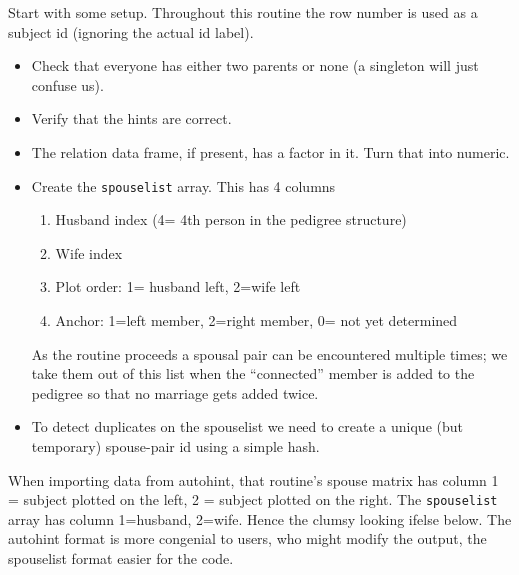 \documentclass{article}
\begin{document}
Start with some setup.  
Throughout this routine the row number is used as a subject
id (ignoring the actual id label).
\begin{itemize}
  \item Check that everyone has either two
    parents or none (a singleton will just confuse us).
  \item Verify that the hints are correct.
  \item The relation data frame, if present, has a factor in it.  Turn
    that into numeric.
\item Create the \Verb!spouselist! array.  This has 4 columns
  \begin{enumerate}
    \item Husband index (4= 4th person in the pedigree structure)
    \item Wife index
    \item Plot order: 1= husband left, 2=wife left
    \item Anchor: 1=left member, 2=right member, 0= not yet determined
      \end{enumerate}
  As the routine proceeds a spousal pair can be encountered
  multiple times; we take them out of this list when the ``connected''
  member is added to the pedigree so that no marriage gets added
  twice.  
\item To detect duplicates on the spouselist we need to create a
  unique (but temporary) spouse-pair id using a simple hash.
\end{itemize}

When importing data from autohint, that routine's spouse matrix %
has column 1 =
subject plotted on the left, 2 = subject plotted on the right.
The \Verb!spouselist! array has column 1=husband, 2=wife.  
Hence the clumsy looking ifelse below.  The autohint format is more
congenial to users, who might modify the output, the spouselist format
easier for the code.
\end{document}
